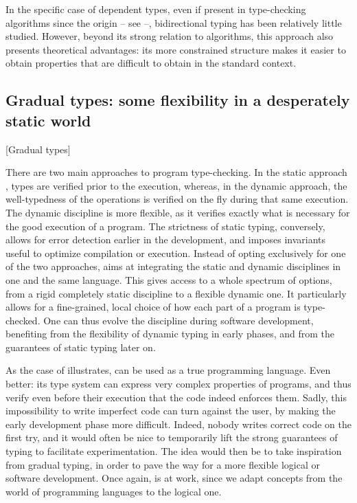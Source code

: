 In the specific case of dependent types, even if present in type-checking algorithms since
the origin – see \eg {} –, bidirectional typing has been relatively little
studied. However, beyond its strong relation to algorithms, this approach also presents
theoretical advantages: its more constrained structure makes it easier
to obtain properties that are difficult to obtain in the standard context.

\subsection{Gradual types: some flexibility in a desperately static world}
  [Gradual types]
\label{sec:intro-graduel-en}

There are two main approaches to program type-checking. In the static approach%
,
types are verified prior to the execution, whereas, in the dynamic approach, the well-typedness
of the operations is verified on the fly during that same execution.
The dynamic discipline is more flexible, as it verifies exactly what is necessary
for the good execution of a program.
The strictness of static typing, conversely, allows for error detection earlier in the
development, and imposes invariants useful to optimize compilation or execution.
Instead of opting exclusively for one of the two approaches, 
 aims at integrating the static and dynamic disciplines in one and the
same language. This gives access to a whole spectrum of options, from a rigid completely static
discipline to a flexible dynamic one. It particularly allows for a fine-grained, local choice
of how each part of a program is type-checked.
One can thus evolve the discipline during software development, benefiting from
the flexibility of dynamic typing in early phases, and from the guarantees of static typing
later on.

As the case of  illustrates,  can be used as a true programming language.
Even better: its type system can express very complex properties of programs, and thus
verify even before their execution that the code indeed enforces them.
Sadly, this impossibility to write imperfect code can turn against the user, by making the
early development phase more difficult. Indeed, nobody writes correct code on the first try,
and it would often be nice to temporarily lift the strong guarantees of typing to
facilitate experimentation. The idea would then be to take inspiration from gradual typing,
in order to pave the way for a more flexible logical or software development. Once again,
 is at work, since we adapt concepts from the world of
programming languages to the logical one.

